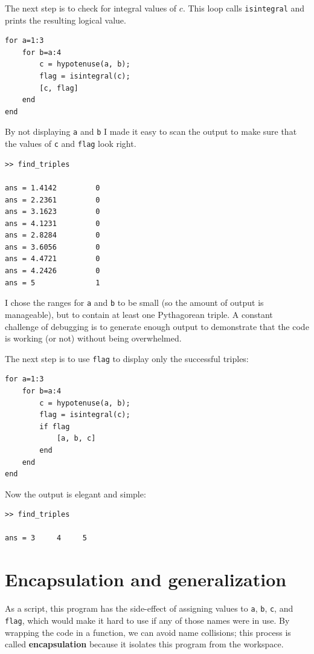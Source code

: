 \documentclass[
]{book}
\begin{document}
The next step is to check for integral values of $c$.  This
loop calls {\tt isintegral} and prints the resulting logical
value.

\begin{verbatim}
for a=1:3
    for b=a:4
        c = hypotenuse(a, b);
        flag = isintegral(c);
        [c, flag]
    end
end
\end{verbatim}

By not displaying {\tt a} and {\tt b} I made it easy to scan the
output to make sure that the values of {\tt c} and {\tt flag}
look right.

\begin{verbatim}
>> find_triples

ans = 1.4142         0
ans = 2.2361         0
ans = 3.1623         0
ans = 4.1231         0
ans = 2.8284         0
ans = 3.6056         0
ans = 4.4721         0
ans = 4.2426         0
ans = 5              1
\end{verbatim}

I chose the ranges for {\tt a} and {\tt b} to be small
(so the amount of output is manageable), but to contain at
least one Pythagorean triple.  A constant challenge of debugging
is to generate enough output to demonstrate that the code is
working (or not) without being overwhelmed.

The next step is to use {\tt flag} to display only the successful
triples:

\begin{verbatim}
for a=1:3
    for b=a:4
        c = hypotenuse(a, b);
        flag = isintegral(c);
        if flag
            [a, b, c]
        end
    end
end
\end{verbatim}

Now the output is elegant and simple:

\begin{verbatim}
>> find_triples

ans = 3     4     5
\end{verbatim}




\section{Encapsulation and generalization}

As a script, this program has the side-effect of assigning values to
{\tt a}, {\tt b}, {\tt c}, and {\tt flag}, which would make it hard to
use if any of those names were in use.  By wrapping the code in a
function, we can avoid name collisions; this process is called {\bf
encapsulation} because it isolates this program from the workspace.
\end{document}
